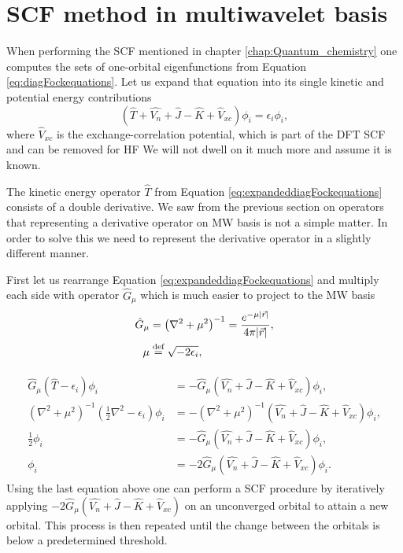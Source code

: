 \documentclass[../master_thesis.tex]{subfiles}
\begin{document}
\section{\ac{SCF} method in multiwavelet basis}
When performing the \ac{SCF} mentioned in chapter \ref{chap:Quantum_chemistry} one
computes the sets of one-orbital eigenfunctions from Equation \ref{eq:diagFockequations}.
Let us expand that equation into its single kinetic and potential energy contributions
\begin{equation}\label{eq:expandeddiagFockequations}
  \left(\hat{T} + \hat{V_n} + \hat{J} - \hat{K} + \hat{V}_{xc}\right)\phi_i = \epsilon_i\phi_i,
\end{equation}
where $\hat{V}_{xc}$ is the exchange-correlation potential, which is part of the
\ac{DFT} \ac{SCF} and can be removed for \ac{HF}
We will not dwell on it much more and assume it is known.

The kinetic energy operator $\hat{T}$ from Equation \ref{eq:expandeddiagFockequations}
consists of a double derivative. We saw from the previous section on operators
that representing a derivative operator on \ac{MW} basis is not a simple matter.
In order to solve this we need to represent the derivative operator in a slightly
different manner.

First let us rearrange Equation \ref{eq:expandeddiagFockequations} and multiply each
side with operator $\hat{G}_\mu$ which is much easier to project to the \ac{MW}
basis
\begin{align}
  \hat{G}_\mu &=\left(\nabla^2 + \mu^2\right)^{-1} = \frac{e^{-\mu|\vec{r}|}}{4\pi|\vec{r}|}, \\
  \mu &\stackrel{\text{def}}{=} \sqrt{-2\epsilon_i},
\end{align}

\begin{align}
  \begin{split}
    \hat{G}_\mu\left(\hat{T} - \epsilon_i\right)\phi_i &= -\hat{G}_\mu\left(\hat{V_n} + \hat{J} - \hat{K} + \hat{V}_{xc}\right)\phi_i,\\
    \left(\nabla^2 + \mu^2\right)^{-1}\left(\frac{1}{2}\nabla^2 - \epsilon_i\right)\phi_i &= -\left(\nabla^2 + \mu^2\right)^{-1}\left(\hat{V_n} + \hat{J} - \hat{K} + \hat{V}_{xc}\right)\phi_i,\\
    \frac{1}{2}\phi_i &= -\hat{G}_\mu\left(\hat{V_n} + \hat{J} - \hat{K} + \hat{V}_{xc}\right)\phi_i,\\
    \phi_i &= -2\hat{G}_\mu\left(\hat{V_n} + \hat{J} - \hat{K} + \hat{V}_{xc}\right)\phi_i.
  \end{split}
\end{align}
Using the last equation above one can perform a \ac{SCF} procedure by iteratively applying
$-2\hat{G}_\mu\left(\hat{V_n} + \hat{J} - \hat{K} + \hat{V}_{xc}\right)$ on an
unconverged orbital to attain a new orbital. This process is then repeated until
the change between the orbitals is below a predetermined threshold.


\biblio
\end{document}

